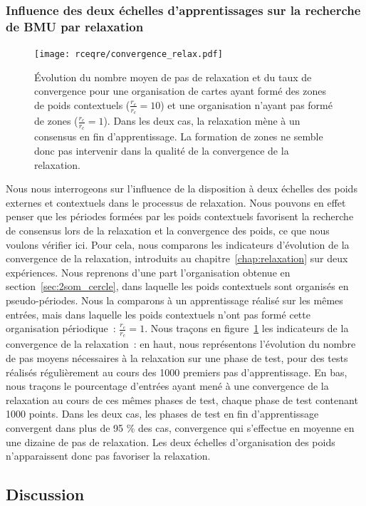 \documentclass[../main]{subfiles}
\begin{document}
\subsubsection{Influence des deux échelles d'apprentissages sur la recherche de BMU par relaxation}
\begin{figure}
	\centering\texttt{[image: rceqre/convergence\_relax.pdf]}
	\caption{\'Evolution du nombre moyen de pas de relaxation et du taux de convergence pour une organisation de cartes ayant formé des zones de poids contextuels ($\frac{r_e}{r_c} = 10$) et une organisation n'ayant pas formé de zones ($\frac{r_e}{r_c} = 1$). Dans les deux cas, la relaxation mène à un consensus en fin d'apprentissage. La formation de zones ne semble donc pas intervenir dans la qualité de la convergence de la relaxation. \label{fig:conv_rcre}}
\end{figure}

Nous nous interrogeons sur l'influence de la disposition à deux échelles des poids externes et contextuels dans le processus de relaxation.
Nous pouvons en effet penser que les périodes formées par les poids contextuels favorisent la recherche de consensus lors de la relaxation et la convergence des poids, ce que nous voulons vérifier ici.
Pour cela, nous comparons les indicateurs d'évolution de la convergence de la relaxation, introduits au chapitre~\ref{chap:relaxation} sur deux expériences.
Nous reprenons d'une part l'organisation obtenue en section~\ref{sec:2som_cercle}, dans laquelle les poids contextuels sont organisés en pseudo-périodes. Nous la comparons à un apprentissage réalisé sur les mêmes entrées, mais dans laquelle les poids contextuels n'ont pas formé cette organisation périodique~: $\frac{r_e}{r_c} = 1$. 
Nous traçons en figure~\ref{fig:conv_rcre} les indicateurs de la convergence de la relaxation~: en haut, nous représentons l'évolution du nombre de pas moyens nécessaires à la relaxation sur une phase de test, pour des tests réalisés régulièrement au cours des 1000 premiers pas d'apprentissage.
En bas, nous traçons le pourcentage d'entrées ayant mené à une convergence de la relaxation au cours de ces mêmes phases de test, chaque phase de test contenant 1000 points.
Dans les deux cas, les phases de test en fin d'apprentissage convergent dans plus de 95 \% des cas, convergence qui s'effectue en moyenne en une dizaine de pas de relaxation. Les deux échelles d'organisation des poids n'apparaissent donc pas favoriser la relaxation.



\subsection{Discussion}
\end{document}
